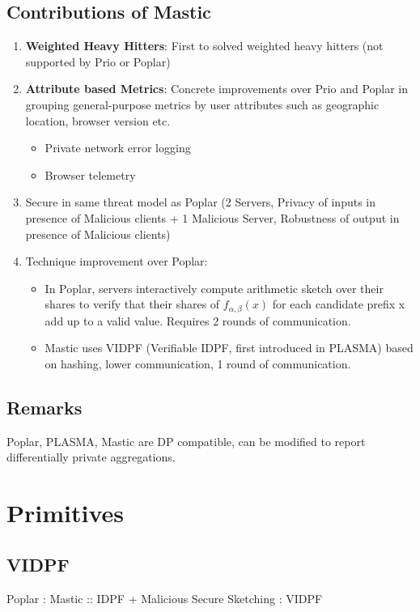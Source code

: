 \subsection{Contributions of Mastic}
\begin{enumerate}
   \item \textbf{Weighted Heavy Hitters}: First to solved weighted heavy hitters (not supported by Prio or Poplar)
   \item \textbf{Attribute based Metrics}: Concrete improvements over Prio and Poplar in grouping general-purpose metrics by user attributes such as geographic location, browser version etc.
    \begin{itemize}
        \item Private network error logging
        \item Browser telemetry
    \end{itemize}
    \item Secure in same threat model as Poplar (2 Servers, Privacy of inputs in presence of Malicious clients + 1 Malicious Server, Robustness of output in presence of Malicious clients)
    \item Technique improvement over Poplar:
    \begin{itemize}
        \item In Poplar, servers interactively compute arithmetic sketch over their shares to verify that their shares of $f_{\alpha, \beta}(x)$ for each candidate prefix x add up to a valid value. Requires 2 rounds of communication.
        \item Mastic uses VIDPF (Verifiable IDPF, first introduced in PLASMA) based on hashing, lower communication, 1 round of communication.
    \end{itemize}
\end{enumerate}

\subsection{Remarks}
Poplar, PLASMA, Mastic are DP compatible, can be modified to report differentially private aggregations.

\section{Primitives}
\subsection{VIDPF}
Poplar : Mastic :: IDPF + Malicious Secure Sketching : VIDPF \\

